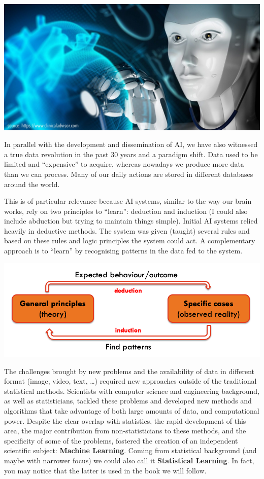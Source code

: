 \documentclass[
]{book}
\begin{document}
\begin{center}\includegraphics[width=1\linewidth]{robot} \end{center}

In parallel with the development and dissemination of AI, we have also witnessed
a true data revolution in the past 30 years and a paradigm shift. Data used to
be limited and ``expensive'' to acquire, whereas nowadays we produce more data than
we can process. Many of our daily actions are stored in different databases
around the world.

This is of particular relevance because AI systems, similar to the way our
brain works, rely on two principles to ``learn'': deduction and induction (I
could also include abduction but trying to maintain things simple). Initial
AI systems relied heavily in deductive methods. The system was given (taught)
several rules and based on these rules and logic principles the
system could act. A complementary approach is to ``learn''
by recognising patterns in the data fed to the system.

\begin{center}\includegraphics[width=1\linewidth]{induction} \end{center}

The challenges brought by new problems and the availability of data in
different format (image, video, text, \ldots) required new approaches outside of
the traditional statistical methods. Scientists with computer science and
engineering background, as well as statisticians, tackled these problems and
developed new methods and algorithms that take advantage of both large amounts
of data, and computational power. Despite the clear overlap with statistics,
the rapid development of this area, the major contribution from
non-statisticians to these methods, and the specificity of some of the problems,
fostered the creation of an independent scientific subject: \textbf{Machine Learning}.
Coming from statistical background (and
maybe with narrower focus) we could also call it \textbf{Statistical Learning}. In
fact, you may notice that the latter is used in the book we will follow.
\end{document}
